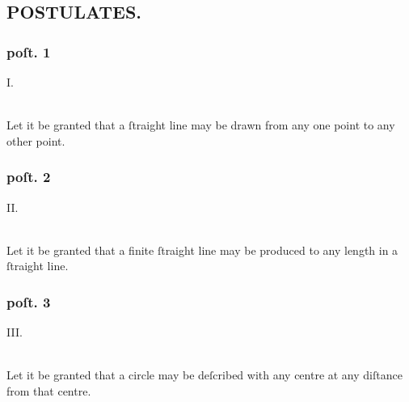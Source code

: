 \hfill

\hfill

\begin{minipage}{0.165\textwidth}
    \phantom{}
\end{minipage}%
\begin{minipage}{0.67\textwidth}
    \subsection[Postulates]{\centering \scshape{\LARGE{POSTULATES.}}}
    \label{subsec:postulates}

    \hfill

    \subsubsection{poſt. 1}
    \begin{center}
        I.\label{post1}\\
        \hfill\\
        \raggedright Let it be granted that a ſtraight line may be drawn from any one point to any other point.
    \end{center}
    \subsubsection{poſt. 2}
    \begin{center}
        II.\label{post2}\\
        \hfill\\
        \raggedright Let it be granted that a finite ſtraight line may be produced to any length in a ſtraight line.
    \end{center}
    \subsubsection{poſt. 3}
    \begin{center}
        III.\label{post3}\\
        \hfill\\
        \raggedright Let it be granted that a circle may be deſcribed with any centre at any diſtance from that centre.
    \end{center}
\end{minipage}
\begin{minipage}{0.165\textwidth}
    \phantom{}
\end{minipage}%

\hfill

